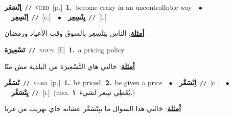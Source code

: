 \documentclass[10pt,a4paper,twoside]{article} %
\begin{document}
\begin{multicols}{2}
{\setlength\topsep{0pt}\textbf{\foreignlanguage{arabic}{اِنْسَعَر}}\ {\color{gray}\texttt{//}\color{black}}\ \textsc{verb}\ [p.]\ \textbf{1.}~become crazy in an uncontrollable way\ \ $\bullet$\ \ \setlength\topsep{0pt}\textbf{\foreignlanguage{arabic}{اِنْسِعِر}}\ {\color{gray}\texttt{//}\color{black}}\ [c.]\ \ $\bullet$\ \ \setlength\topsep{0pt}\textbf{\foreignlanguage{arabic}{يِنْسِعِر}}\ {\color{gray}\texttt{//}\color{black}}\ [i.]\  \begin{flushright}\color{gray}\foreignlanguage{arabic}{\textbf{\underline{\foreignlanguage{arabic}{أمثلة}}}: الناس بتِنْسِعِر بالسوق وقت الأعياد ورمضان}\end{flushright}\color{black}} \vspace{2mm}

{\setlength\topsep{0pt}\textbf{\foreignlanguage{arabic}{تَسْعِيرَة}}\ {\color{gray}\texttt{//}\color{black}}\ \textsc{noun}\ [f.]\ \textbf{1.}~a pricing policy\  \begin{flushright}\color{gray}\foreignlanguage{arabic}{\textbf{\underline{\foreignlanguage{arabic}{أمثلة}}}: خالتي هاي التَّسْعِيرَة من البلدية مش منّا}\end{flushright}\color{black}} \vspace{2mm}

{\setlength\topsep{0pt}\textbf{\foreignlanguage{arabic}{تْسَعَّر}}\ {\color{gray}\texttt{//}\color{black}}\ \textsc{verb}\ [p.]\ \textbf{1.}~be priced.  \textbf{2.}~be given a price\ \ $\bullet$\ \ \setlength\topsep{0pt}\textbf{\foreignlanguage{arabic}{اِتْسَعَّر}}\ {\color{gray}\texttt{//}\color{black}}\ [c.]\ \ $\bullet$\ \ \setlength\topsep{0pt}\textbf{\foreignlanguage{arabic}{يِتْسَعَّر}}\ {\color{gray}\texttt{//}\color{black}}\ [i.]\ \color{gray}(msa. \foreignlanguage{arabic}{يُعْطِي سِعر لشيء}~\foreignlanguage{arabic}{\textbf{١.}})\color{black}\  \begin{flushright}\color{gray}\foreignlanguage{arabic}{\textbf{\underline{\foreignlanguage{arabic}{أمثلة}}}: خالتي هذا السوال ما بيِتْسَعَّر عشانه جاي تهريب من غربا}\end{flushright}\color{black}} \vspace{2mm}


\end{multicols}
\end{document}

